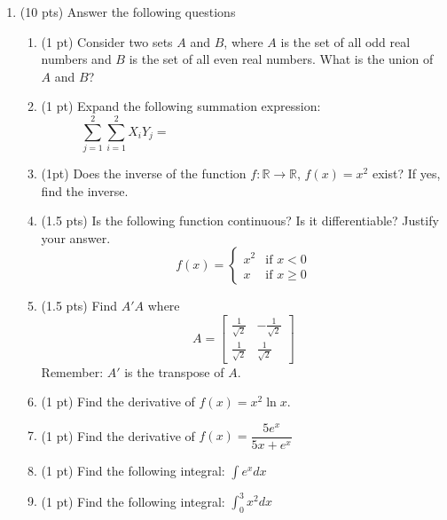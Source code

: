 \documentclass{./../../Latex/tests}
\begin{document}
\thispagestyle{plain}
\vspace{0.5em}

\begin{enumerate}	

\item (10 pts) Answer the following questions
\begin{enumerate}
\item (1 pt) Consider two sets $A$ and $B$, where $A$ is the set of all odd real numbers and $B$ is the set of all even real numbers. What is the union of $A$ and $B$? 
\vspace{3cm}
\item (1 pt) Expand the following summation expression: $$\sum_{j=1}^2  \sum_{i=1}^2 X_i Y_j = \hspace{8cm}$$
 \vspace{1cm}
\item (1pt) Does the inverse of the function $f: \mathbb{R} \rightarrow \mathbb{R}$, $f(x)=x^2$ exist? If yes, find the inverse.
\vspace{3cm}
\item (1.5 pts) Is the following function continuous? Is it differentiable? Justify your answer.
$$ f(x) = 
    \begin{cases} 
    x^2 & \text{if } x < 0 \\
    x & \text{if } x \geq 0 
    \end{cases} $$
\vspace{3cm}
\newpage
\item (1.5 pts) Find $A'A$ where $$ A=\begin{bmatrix}
	\frac{1}{\sqrt{2}} & -\frac{1}{\sqrt{2}} \\ \frac{1}{\sqrt{2}} & \frac{1}{\sqrt{2}}
\end{bmatrix} $$
Remember: $A'$ is the transpose of $A$.
\vspace{6cm}

\item (1 pt) Find the derivative of $ f(x) = x^2 \ln x $.
\vspace{3cm}
\item (1 pt) Find the derivative of $f(x) = \dfrac{5e^x}{5x+e^x}$
  \vspace{3cm}
  \item (1 pt) Find the following integral: $ \int e^x dx $
    \vspace{2.5cm}
\item (1 pt) Find the following integral: $ \int_0^3 x^2 dx $


\end{enumerate}
\end{enumerate}
\end{document}
